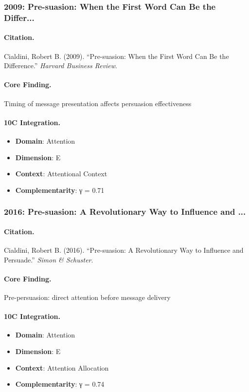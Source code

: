 \subsubsection{2009: Pre-suasion: When the First Word Can Be the Differ...}

\paragraph{Citation.}
Cialdini, Robert B. (2009). ``Pre-suasion: When the First Word Can Be the Difference.''
\textit{Harvard Business Review}.

\paragraph{Core Finding.}
Timing of message presentation affects persuasion effectiveness

\paragraph{10C Integration.}
\begin{itemize}[nosep]
  \item \textbf{Domain}: Attention
  \item \textbf{Dimension}: E
  \item \textbf{Context}: Attentional Context
  \item \textbf{Complementarity}: γ = 0.71
\end{itemize}

\subsubsection{2016: Pre-suasion: A Revolutionary Way to Influence and ...}

\paragraph{Citation.}
Cialdini, Robert B. (2016). ``Pre-suasion: A Revolutionary Way to Influence and Persuade.''
\textit{Simon & Schuster}.

\paragraph{Core Finding.}
Pre-persuasion: direct attention before message delivery

\paragraph{10C Integration.}
\begin{itemize}[nosep]
  \item \textbf{Domain}: Attention
  \item \textbf{Dimension}: E
  \item \textbf{Context}: Attention Allocation
  \item \textbf{Complementarity}: γ = 0.74
\end{itemize}

